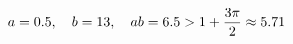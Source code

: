 \documentclass[preview]{standalone}
\begin{document}
\begin{align*}
\special{dvisvgm:raw <g id='unique000'>}a=0.5,\quad b=13,\quad ab=6.5>1+\frac{3\pi}{2}\approx5.71\special{dvisvgm:raw </g>}
\end{align*}
\end{document}

